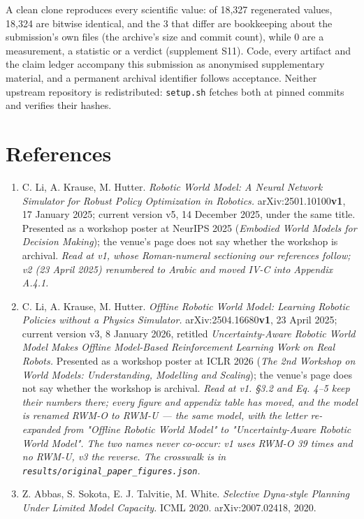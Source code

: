 \documentclass[10pt]{article}
\begin{document}
A clean clone reproduces every scientific value: of 18,327 regenerated values, 18,324 are bitwise identical, and the 3 that differ are bookkeeping about the submission's own files (the archive's size and commit count), while 0 are a measurement, a statistic or a verdict (supplement S11). Code, every artifact and the claim ledger accompany this submission as anonymised supplementary material, and a permanent archival identifier follows acceptance. Neither upstream repository is redistributed: \texttt{setup.sh} fetches both at pinned commits and verifies their hashes.

\section*{References}

\begin{enumerate}
\item C. Li, A. Krause, M. Hutter. \emph{Robotic World Model: A Neural Network Simulator for Robust Policy Optimization in Robotics.} arXiv:2501.10100\textbf{v1}, 17 January 2025; current version v5, 14 December 2025, under the same title. Presented as a workshop poster at NeurIPS 2025 (\emph{Embodied World Models for Decision Making}); the venue's page does not say whether the workshop is archival. \emph{Read at v1, whose Roman-numeral sectioning our references follow; v2 (23 April 2025) renumbered to Arabic and moved IV-C into Appendix A.4.1.}
\item C. Li, A. Krause, M. Hutter. \emph{Offline Robotic World Model: Learning Robotic Policies without a Physics Simulator.} arXiv:2504.16680\textbf{v1}, 23 April 2025; current version v3, 8 January 2026, retitled \emph{Uncertainty-Aware Robotic World Model Makes Offline Model-Based Reinforcement Learning Work on Real Robots.} Presented as a workshop poster at ICLR 2026 (\emph{The 2nd Workshop on World Models: Understanding, Modelling and Scaling}); the venue's page does not say whether the workshop is archival. \emph{Read at v1. \S{}3.2 and Eq. 4--5 keep their numbers there; every figure and appendix table has moved, and the model is renamed RWM-O to RWM-U --- the same model, with the letter re-expanded from "Offline Robotic World Model" to "Uncertainty-Aware Robotic World Model". The two names never co-occur: v1 uses RWM-O 39 times and no RWM-U, v3 the reverse. The crosswalk is in \texttt{results/\allowbreak{}original\_\allowbreak{}paper\_\allowbreak{}figures\allowbreak{}.json}.}
\item Z. Abbas, S. Sokota, E. J. Talvitie, M. White. \emph{Selective Dyna-style Planning Under Limited Model Capacity.} ICML 2020. arXiv:2007.02418, 2020.

\end{enumerate}
\end{document}
